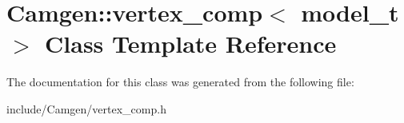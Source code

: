 \hypertarget{a00566}{\section{Camgen\-:\-:vertex\-\_\-comp$<$ model\-\_\-t $>$ Class Template Reference}
\label{a00566}
}


The documentation for this class was generated from the following file\-:\begin{DoxyCompactItemize}
\item 
include/\-Camgen/vertex\-\_\-comp.\-h\end{DoxyCompactItemize}

